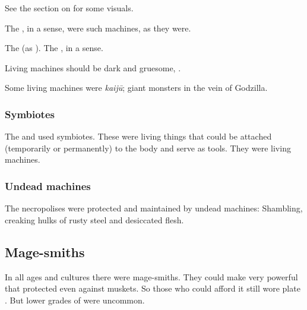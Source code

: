 See the section on  for some visuals. 

The \noggyaleth, in a sense, were such machines,  as they were. 

The \dragons {} (as ). 
The , in a sense.

Living machines should be dark and gruesome, . 

Some living machines were \emph{kaij\=u}; giant monsters in the vein of Godzilla. 





\subsubsection{Symbiotes}
The \dragons and \ophidians used symbiotes. 
These were living things that could be attached (temporarily or permanently) to the body and serve as tools. 
They were living machines. 





\subsubsection{Undead machines}
The \draconic{} necropolises were protected and maintained by undead machines: 
Shambling, creaking hulks of rusty steel and desiccated flesh. 










\subsection{Mage-smiths}
In all ages and cultures there were mage-smiths. 
They could make very powerful \armour that protected even against muskets.
So those who could afford it still wore plate \armour.
But lower grades of \armour were uncommon.

